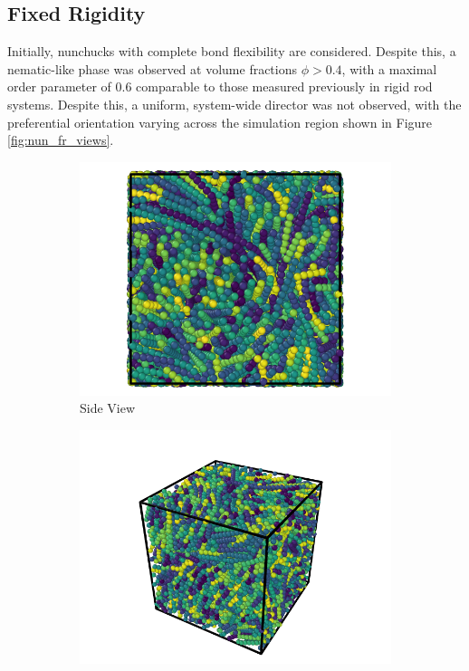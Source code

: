 \documentclass[11pt, a4paper]{article} %
\begin{document}
\subsection{Fixed Rigidity}

Initially, nunchucks with complete bond flexibility are considered. Despite this, a nematic-like phase was observed at volume fractions $\phi > 0.4$, with a maximal order parameter of \num{0.6} comparable to those measured previously in rigid rod systems. Despite this, a uniform, system-wide director was not observed, with the preferential orientation varying across the simulation region shown in Figure \ref{fig:nun_fr_views}.


\begin{figure}
	\centering
	\begin{subfigure}{.5\textwidth}
		\centering
		\includegraphics[width=.9\linewidth]{Figures/nun_fr_side}
		\caption{Side View}
		\label{fig:nun_fr_side}
	\end{subfigure}%
	\begin{subfigure}{.5\textwidth}
		\centering
		\includegraphics[width=.9\linewidth]{Figures/nun_fr_perspective}

\end{subfigure}
\end{figure}
\end{document}
